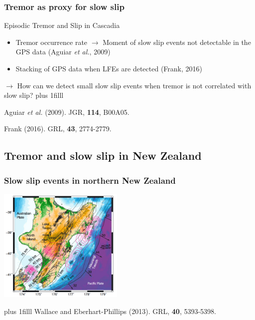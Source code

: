 \documentclass{beamer}
\newcommand{\btVFill}{\vskip0pt plus 1filll}
\begin{document}
	\begin{frame}
		\frametitle{Tremor as proxy for slow slip}

		\vspace{3em}

		Episodic Tremor and Slip in Cascadia
		\begin{itemize}
			\item Tremor occurrence rate $\rightarrow$ Moment of slow slip events not detectable in the GPS data (Aguiar \textit{et al.}, 2009)
			\item Stacking of GPS data when LFEs are detected (Frank, 2016)
		\end{itemize}
		$\rightarrow$ How can we detect small slow slip events when tremor is not correlated with slow slip?
		\btVFill
		\tiny{Aguiar \textit{et al.} (2009). JGR, \textbf{114}, B00A05.

		Frank (2016). GRL, \textbf{43}, 2774-2779.}
	\end{frame}


	\subsection{Tremor and slow slip in New Zealand}
		
	\begin{frame}
		\frametitle{Slow slip events in northern New Zealand}
		\begin{center}
			\includegraphics[trim={0cm 0cm 0cm 0cm}, clip, width=6cm]{articles/wallace_eberhart-phillips_2013_1.png}
		\end{center}
		\btVFill
		\tiny{Wallace and Eberhart-Phillips (2013). GRL, \textbf{40}, 5393-5398.}
	\end{frame}
\end{document}
